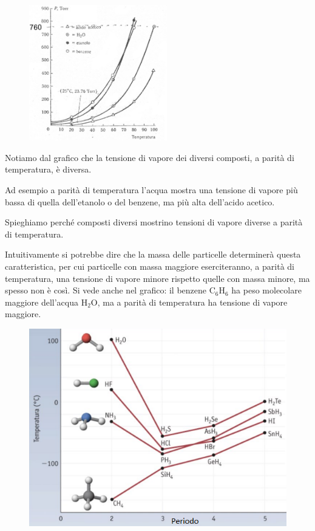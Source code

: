\hspace{0.5cm}\begin{minipage}{0.5 \textwidth}
    \begin{figure}[H]
        \includegraphics[width=6cm]{immagini/tensioni_di_vapore.png}
    \end{figure}
\end{minipage}
\begin{minipage}{0.4 \textwidth}
\vspace{0.5cm}Notiamo dal grafico che la tensione di vapore dei diversi composti, a parità di temperatura, è diversa.

\vspace{0.2cm}Ad esempio a parità di temperatura l'acqua mostra una tensione di vapore più bassa di quella dell'etanolo o del benzene, ma più alta dell'acido acetico.
\end{minipage}

Spieghiamo perché composti diversi mostrino tensioni di vapore diverse a parità di temperatura.

Intuitivamente si potrebbe dire che la massa delle particelle determinerà questa caratteristica, per cui particelle con massa maggiore eserciteranno, a parità di temperatura, una tensione di vapore minore rispetto quelle con massa minore, ma spesso non è così. Si vede anche nel grafico: il benzene C$_6$H$_6$ ha peso molecolare maggiore dell'acqua H$_2$O, ma a parità di temperatura ha tensione di vapore maggiore.

\begin{figure}[htp]
    \centering
    \includegraphics[width=12cm]{immagini/temperature_ebollizione.png}
\end{figure}

